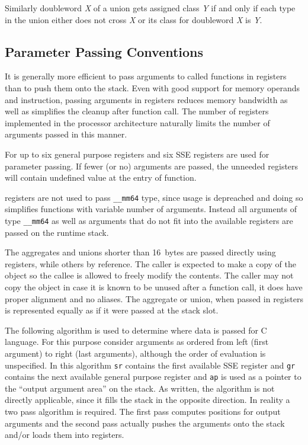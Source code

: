 Similarly doubleword \emph{X} of a union gets assigned class \emph{Y}
if and only if each type in the union either does not cross \emph{X}
or its class for doubleword \emph{X} is \emph{Y}.

\subsection{Parameter Passing Conventions}

It is generally more efficient to pass arguments to called functions
in registers than to push them onto the stack. Even with good support
for memory operands and  instruction, passing arguments in
registers reduces memory bandwidth as well as simplifies the cleanup
after function call.  The number of registers implemented in the
processor architecture naturally limits the number of arguments passed
in this manner.

For \xARCH up to six general purpose registers and six SSE registers
are used for parameter passing.  If fewer (or no) arguments are
passed, the unneeded registers will contain undefined value at the
entry of function.  

\MMX{} registers are not used to pass \verb|__mm64| type, since \MMX{}
usage is depreached and doing so simplifies functions with variable
number of arguments.  Instead all arguments of type \verb|__mm64| as
well as arguments that do not fit into the available registers are
passed on the runtime stack.

The aggregates and unions shorter than 16~bytes are passed directly
using registers, while others by reference.  The caller is expected to
make a copy of the object so the callee is allowed to freely modify
the contents.  The caller may not copy the object in case it is known
to be unused after a function call, it does have proper alignment and
no aliases. The aggregate or union, when passed in registers is
represented equally as if it were passed at the stack slot.

The following algorithm is used to determine where data is passed for
C language.  For this purpose consider arguments as ordered from left
(first argument) to right (last arguments), although the order of
evaluation is unspecified. In this algorithm \verb|sr| contains the
first available SSE register and \verb|gr| contains the next available
general purpose register and \verb|ap| is used as a pointer to the
``output argument area'' on the stack.  As written, the algorithm is
not directly applicable, since it fills the stack in the opposite
direction.  In reality a two pass algorithm is required.  The first
pass computes positions for output arguments and the second pass
actually pushes the arguments onto the stack and/or loads them into
registers.



